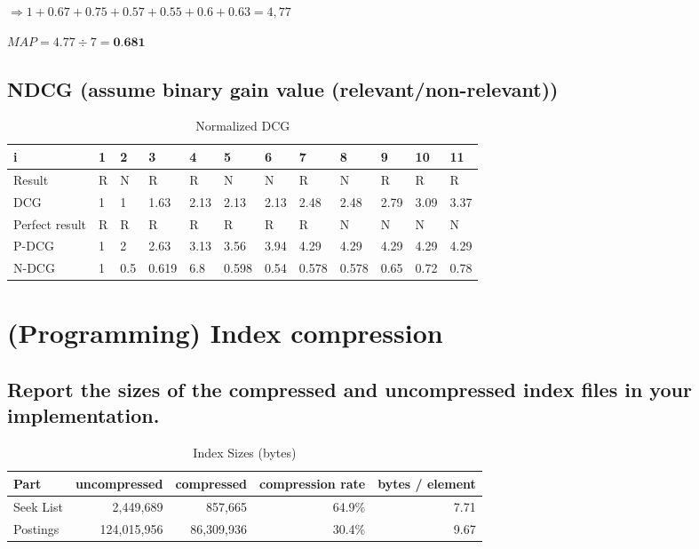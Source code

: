 \documentclass{scrartcl}
\begin{document}
$\Rightarrow 1 + 0.67 + 0.75 + 0.57 + 0.55 + 0.6 + 0.63 = 4,77 $

$ MAP = 4.77 \div 7 = \textbf{0.681} $

\subsection{NDCG (assume binary gain value (relevant/non-relevant)) }

\begin{table}[h]
\centering
\caption{Normalized DCG}
\begin{tabular}{|l|l|l|l|l|l|l|l|l|l|l|l|}
\hline
i              & 1 & 2   & 3     & 4    & 5     & 6    & 7     & 8     & 9    & 10   & 11   \\ \hline
Result         & R & N   & R     & R    & N     & N    & R     & N     & R    & R    & R    \\ \hline
DCG            & 1 & 1   & 1.63  & 2.13 & 2.13  & 2.13 & 2.48  & 2.48  & 2.79 & 3.09 & 3.37 \\ \hline
Perfect result & R & R   & R     & R    & R     & R    & R     & N     & N    & N    & N    \\ \hline
P-DCG          & 1 & 2   & 2.63  & 3.13 & 3.56  & 3.94 & 4.29  & 4.29  & 4.29 & 4.29 & 4.29 \\ \hline
N-DCG          & 1 & 0.5 & 0.619 & 6.8  & 0.598 & 0.54 & 0.578 & 0.578 & 0.65 & 0.72 & 0.78 \\ \hline
\end{tabular}
\end{table}




\section{(Programming) Index compression}

\subsection{Report the sizes of the compressed and uncompressed index files in your implementation.}

\begin{table}[h]
	\centering
	\caption{Index Sizes (bytes)}
	\begin{tabular}{l|r|r|r|r}
		Part           & uncompressed & compressed   & compression rate & bytes / element  \\ \hline
		Seek List      &    2,449,689 & 857,665   & 64.9\%   &  7.71   \\
		Postings       &  124,015,956 & 86,309,936   & 30.4\%  &  9.67   \\
	\end{tabular}
\end{table}
\end{document}
